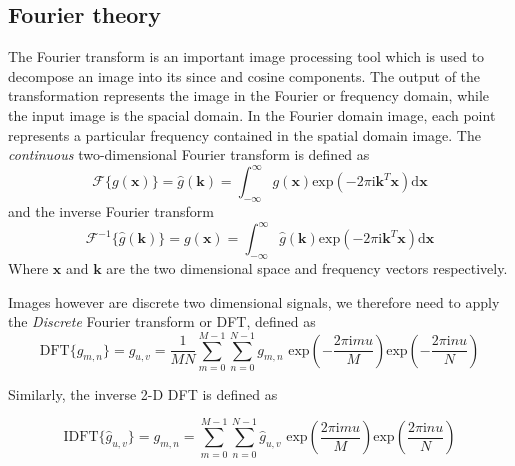 		\subsection{Fourier theory}
		The Fourier transform is an important image processing tool which is used to decompose an image into its since and cosine components. The output of the transformation represents the image in the Fourier or frequency domain, while the input image is the spacial domain. In the Fourier domain image, each point represents a particular frequency contained in the spatial domain image.
		The \textit{continuous} two-dimensional Fourier transform is defined as
		\begin{equation}
				\mathscr{F}\{ g(\mathbf{x})  \} = \hat{g}(\mathbf{k}) = 
				\int_{-\infty}^{\infty} g(\mathbf{x}) \text{exp}\left( -2 \pi \text{i} \mathbf{k}^T \mathbf{x}  \right) \text{d}\mathbf{x}
		\end{equation}
		and the inverse Fourier transform
		\begin{equation}
				\mathscr{F}^{-1}\{ \hat{g}(\mathbf{k}) \} = g(\mathbf{x}) =
				 \int_{-\infty}^{\infty} \hat{g}(\mathbf{k})
			\text{exp}\left( -2 \pi \text{i} \mathbf{k}^T \mathbf{x}  \right) \text{d}\mathbf{x}
		\end{equation}
		Where $\mathbf{x}$ and $\mathbf{k}$  are the two dimensional space and frequency vectors respectively. 
		
		Images however are discrete two dimensional signals, we therefore need to apply the \textit{Discrete} Fourier transform or DFT, defined as
		\begin{equation}
			\text{DFT}\{ g_{m,n} \} = \hat{g}_{u,v} = \dfrac{1}{MN} \sum_{m=0}^{M-1} \sum_{n=0}^{N-1}
			g_{m,n} \text{ exp} \left(  - \dfrac{2 \pi \text{i} m u}{M}  \right)
						\text{exp} \left(  - \dfrac{2 \pi \text{i} n u}{N}  \right)
		\end{equation}		 

		Similarly, the inverse 2-D DFT is defined as 
		
		\begin{equation}
		 \text{IDFT}\{\hat{g}_{u,v}\} = g_{m,n} = \sum_{m=0}^{M-1} \sum_{n=0}^{N-1} \hat{g}_{u,v}
			\text{ exp} \left(   \dfrac{2 \pi \text{i} m u}{M}  \right)
			\text{exp} \left(   \dfrac{2 \pi \text{i} n u}{N}  \right)
		\end{equation}
		
		
